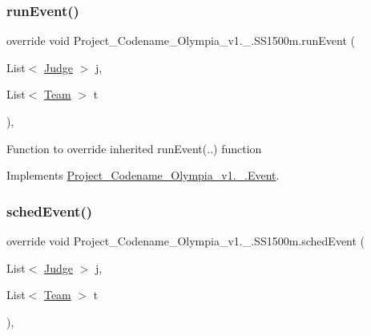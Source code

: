 \mbox{\label{classProject__Codename__Olympia__v1_1_1__0_1_1SS1500m_a749ab5adb7bd98da6e7370fef95d46fd}} 
\subsubsection{\texorpdfstring{run\+Event()}{runEvent()}}
{\footnotesize\ttfamily override void Project\+\_\+\+Codename\+\_\+\+Olympia\+\_\+v1.\+\_.\+S\+S1500m.\+run\+Event (\begin{DoxyParamCaption}\item[{List$<$ \hyperlink{classProject__Codename__Olympia__v1_1_1__0_1_1Judge}{Judge} $>$}]{j,  }\item[{List$<$ \hyperlink{classProject__Codename__Olympia__v1_1_1__0_1_1Team}{Team} $>$}]{t }\end{DoxyParamCaption})\hspace{0.3cm}{\ttfamily [inline]}, {\ttfamily [virtual]}}

Function to override inherited run\+Event(..) function 

Implements \hyperlink{classProject__Codename__Olympia__v1_1_1__0_1_1Event_ac6ff060da23153c02da49937dcf9f326}{Project\+\_\+\+Codename\+\_\+\+Olympia\+\_\+v1.\+\_.\+Event}.

\mbox{\label{classProject__Codename__Olympia__v1_1_1__0_1_1SS1500m_af87bf024ce84968289b999323d1a53bb}} 
\subsubsection{\texorpdfstring{sched\+Event()}{schedEvent()}}
{\footnotesize\ttfamily override void Project\+\_\+\+Codename\+\_\+\+Olympia\+\_\+v1.\+\_.\+S\+S1500m.\+sched\+Event (\begin{DoxyParamCaption}\item[{List$<$ \hyperlink{classProject__Codename__Olympia__v1_1_1__0_1_1Judge}{Judge} $>$}]{j,  }\item[{List$<$ \hyperlink{classProject__Codename__Olympia__v1_1_1__0_1_1Team}{Team} $>$}]{t }\end{DoxyParamCaption})\hspace{0.3cm}{\ttfamily [inline]}, {\ttfamily [virtual]}}

